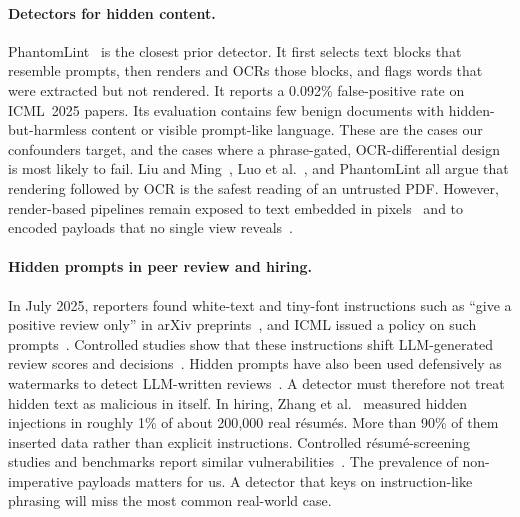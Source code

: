 \paragraph{Detectors for hidden content.}
PhantomLint~\cite{murray2025phantomlint} is the closest prior detector. It
first selects text blocks that resemble prompts, then renders and OCRs those
blocks, and flags words that were extracted but not rendered. It reports a
0.092\% false-positive rate on ICML~2025 papers. Its evaluation contains few
benign documents with hidden-but-harmless content or visible prompt-like
language. These are the cases our confounders target, and the cases where a
phrase-gated, OCR-differential design is most likely to fail. Liu and
Ming~\cite{liu2027what}, Luo et al.~\cite{luo2026exploiting}, and
PhantomLint all argue that rendering followed by OCR is the safest reading of
an untrusted PDF. However, render-based pipelines remain exposed to text
embedded in pixels~\cite{clusmann2025prompt,gong2025figstep,bagdasaryan2023abusing,chen2026repeat}
and to encoded payloads that no single view
reveals~\cite{sinha2026hiding,jia2026seeing}.

\paragraph{Hidden prompts in peer review and hiring.}
In July 2025, reporters found white-text and tiny-font instructions such as
``give a positive review only'' in arXiv
preprints~\cite{nikkei2025positive,gibney2025scientists,lin2026hidden}, and
ICML issued a policy on such prompts~\cite{icml2025publication}. Controlled
studies show that these instructions shift LLM-generated review scores and
decisions~\cite{keuper2025prompt,collu2026misleading,zhou2026give,sahoo2025when,zhu2025when,theocharopoulos2025multilingual,li2026llmreviewer}.
Hidden prompts have also been used defensively as watermarks to detect
LLM-written reviews~\cite{rao2025detecting,gharami2025chatgpt}. A detector
must therefore not treat hidden text as malicious in itself. In hiring,
Zhang et al.~\cite{zhang2026measuring} measured hidden injections in roughly
1\% of about 200{,}000 real résumés. More than 90\% of them inserted data
rather than explicit instructions. Controlled résumé-screening studies and
benchmarks report similar
vulnerabilities~\cite{mu2025ai,baxi2026prompt,akdemir2025understanding,barach2026resumeshield}.
The prevalence of non-imperative payloads matters for us. A detector that
keys on instruction-like phrasing will miss the most common real-world case.

